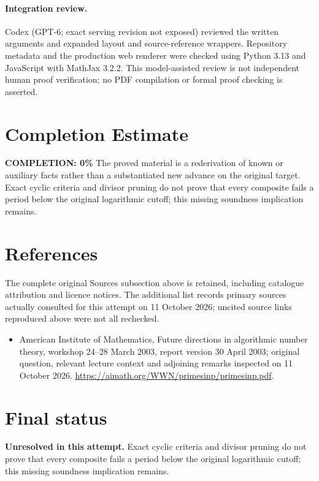 \documentclass[11pt]{article}
\begin{document}
\paragraph{Integration review.} Codex (GPT-6; exact serving revision not exposed) reviewed the written arguments and expanded layout and source-reference wrappers. Repository metadata and the production web renderer were checked using Python 3.13 and JavaScript with MathJax 3.2.2. This model-assisted review is not independent human proof verification; no PDF compilation or formal proof checking is asserted.

\section{Completion Estimate}
\noindent\textbf{COMPLETION: 0\%}
The proved material is a rederivation of known or auxiliary facts rather than a substantiated new advance on the original target. Exact cyclic criteria and divisor pruning do not prove that every composite fails a period below the original logarithmic cutoff; this missing soundness implication remains.
\section{References}
The complete original Sources subsection above is retained, including catalogue attribution and licence notices. The additional list records primary sources actually consulted for this attempt on 11 October 2026; uncited source links reproduced above were not all rechecked.
\begin{itemize}
\item American Institute of Mathematics, Future directions in algorithmic number theory, workshop 24--28 March 2003, report version 30 April 2003; original question, relevant lecture context and adjoining remarks inspected on 11 October 2026. \url{https://aimath.org/WWN/primesinp/primesinp.pdf}.
\end{itemize}
\section{Final status}
\textbf{Unresolved in this attempt.} Exact cyclic criteria and divisor pruning do not prove that every composite fails a period below the original logarithmic cutoff; this missing soundness implication remains.
\end{document}
